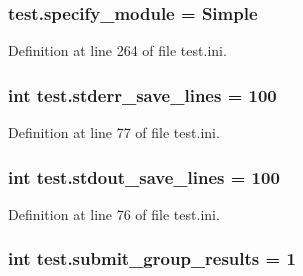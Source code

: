 \hypertarget{namespacetest_a51dc8620c2e0770b19a7478de3cdfe9f}{
\subsubsection[{specify\-\_\-module}]{\setlength{\rightskip}{0pt plus 5cm}test.\-specify\-\_\-module = Simple}}\label{namespacetest_a51dc8620c2e0770b19a7478de3cdfe9f}


Definition at line 264 of file test.\-ini.

\hypertarget{namespacetest_a6eb3ee4197f9fe28682af6f06cbc5e8f}{
\subsubsection[{stderr\-\_\-save\-\_\-lines}]{\setlength{\rightskip}{0pt plus 5cm}int test.\-stderr\-\_\-save\-\_\-lines = 100}}\label{namespacetest_a6eb3ee4197f9fe28682af6f06cbc5e8f}


Definition at line 77 of file test.\-ini.

\hypertarget{namespacetest_ad4c8d1b4c04f99668eb1f7168aee5dec}{
\subsubsection[{stdout\-\_\-save\-\_\-lines}]{\setlength{\rightskip}{0pt plus 5cm}int test.\-stdout\-\_\-save\-\_\-lines = 100}}\label{namespacetest_ad4c8d1b4c04f99668eb1f7168aee5dec}


Definition at line 76 of file test.\-ini.

\hypertarget{namespacetest_afa4c185ba5d92fdbefba5736ef442945}{
\subsubsection[{submit\-\_\-group\-\_\-results}]{\setlength{\rightskip}{0pt plus 5cm}int test.\-submit\-\_\-group\-\_\-results = 1}}\label{namespacetest_afa4c185ba5d92fdbefba5736ef442945}


